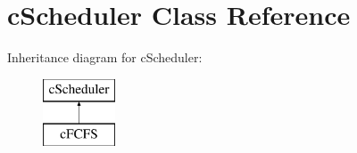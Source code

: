 \hypertarget{classcScheduler}{\section{c\-Scheduler \-Class \-Reference}
\label{d0/d21/classcScheduler}
}
\-Inheritance diagram for c\-Scheduler\-:\begin{figure}[H]
\begin{center}
\leavevmode
\includegraphics[height=2.000000cm]{d0/d21/classcScheduler}
\end{center}
\end{figure}

